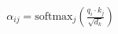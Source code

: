 \documentclass[preview]{standalone}
\begin{document}
\begin{align*}
\alpha_{ij} = \mathrm{softmax}_j\!\left(\frac{q_i \cdot k_j}{\sqrt{d_k}}\right)
\end{align*}
\end{document}
